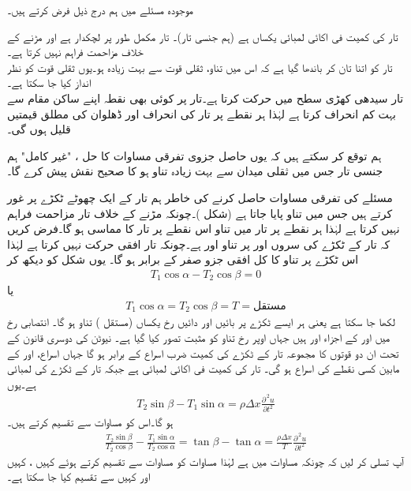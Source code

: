 موجودہ مسئلے میں ہم درج ذیل فرض کرتے ہیں۔

 \quad تار کی کمیت فی اکائی لمبائی یکساں ہے (ہم جنسی تار)۔ تار مکمل طور پر لچکدار ہے اور مڑنے کے خلاف مزاحمت فراہم نہیں کرتا ہے۔ \\
 \quad تار کو اتنا تان کر باندھا گیا ہے کہ اس میں تناو، ثقلی قوت سے بہت زیادہ ہو۔یوں ثقلی قوت کو نظر انداز کیا جا سکتا ہے۔\\
 \quad تار سیدھی کھڑی سطح میں حرکت کرتا ہے۔تار پر کوئی بھی نقطہ اپنے ساکن مقام سے بہت کم انحراف کرتا ہے لہٰذا ہر نقطے پر تار کی انحراف اور ڈھلوان کی مطلق قیمتیں قلیل ہوں گی۔ 


ہم توقع کر سکتے ہیں کہ یوں حاصل جزوی تفرقی مساوات کا حل ،  "غیر کامل"  ہم جنسی تار جس میں ثقلی میدان سے بہت زیادہ تناو ہو  کا صحیح نقش پیش کرے گا۔  

مسئلے کی تفرقی مساوات حاصل کرنے کی خاطر ہم تار کے ایک چھوٹے ٹکڑے پر غور کرتے ہیں جس میں تناو  پایا جاتا ہے (شکل )۔چونکہ مڑنے کے خلاف تار مزاحمت فراہم نہیں کرتا ہے لہٰذا ہر نقطے پر تار میں تناو اس نقطے پر تار کا مماسی ہو گا۔فرض کریں کہ تار کے ٹکڑے  کی سروں  اور   پر تناو  اور  ہے۔چونکہ تار افقی حرکت نہیں کرتا ہے لہٰذا اس ٹکڑے پر تناو کا کل افقی جزو صفر کے برابر ہو گا۔ یوں شکل  کو دیکھ کر 
\begin{align*}
T_1\cos \alpha-T_2\cos \beta=0
\end{align*}
یا
\begin{align}\label{مساوات_جزوی_تار_الف}
T_1\cos \alpha=T_2\cos \beta=T=\text{مستقل}
\end{align}
لکھا جا سکتا ہے  یعنی ہر ایسے ٹکڑے پر بائیں اور دائیں رخ یکساں (مستقل ) تناو ہو گا۔ انتصابی رخ میں  اور  کے اجزاء  اور  ہیں جہاں اوپر رخ تناو کو مثبت تصور کیا گیا ہے۔ نیوٹن کی دوسری قانون کے تحت ان دو قوتوں کا مجموعہ تار کے ٹکڑے کی کمیت  ضرب  اسراع  کے برابر ہو گا جہاں اسراع،   اور  کے مابین کسی نقطے  کی اسراع ہو گی۔ تار کی کمیت فی اکائی لمبائی  ہے جبکہ تار کے ٹکڑے کی لمبائی  ہے۔یوں
\begin{align}\label{مساوات_جزوی_تار_ب}
T_2\sin \beta-T_1\sin \alpha=\rho\Delta x\frac{\partial^{\,2}u}{\partial t^2}
\end{align} 
ہو گا۔اس کو مساوات  سے تقسیم کرتے ہیں۔
\begin{align}\label{مساوات_جزوی_تار_پ}
\frac{T_2\sin \beta}{T_2\cos \beta}-\frac{T_1\sin \alpha}{T_2\cos \alpha}=\tan \beta -\tan \alpha=\frac{\rho \Delta x}{T}\frac{\partial^{\,2}u}{\partial t^2}
\end{align}
آپ تسلی کر لیں کہ چونکہ مساوات  میں  ہے لہٰذا مساوات  کو مساوات  سے تقسیم کرتے ہوئے کہیں ، کہیں  اور کہیں  سے تقسیم کیا جا سکتا ہے۔ 

